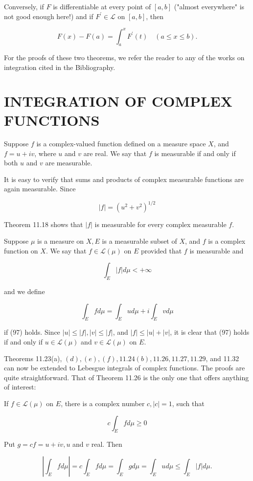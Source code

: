 \documentclass[10pt]{article}
\begin{document}
Conversely, if $F$ is differentiable at every point of $[a, b]$ ("almost everywhere" is not good enough here!) and if $F^{\prime} \in \mathscr{L}$ on $[a, b]$, then

$$
F(x)-F(a)=\int_{a}^{x} F^{\prime}(t) \quad(a \leq x \leq b) .
$$

For the proofs of these two theorems, we refer the reader to any of the works on integration cited in the Bibliography.

\section{INTEGRATION OF COMPLEX FUNCTIONS}
Suppose $f$ is a complex-valued function defined on a measure space $X$, and $f=u+i v$, where $u$ and $v$ are real. We say that $f$ is measurable if and only if both $u$ and $v$ are measurable.

It is easy to verify that sums and products of complex measurable functions are again measurable. Since

$$
|f|=\left(u^{2}+v^{2}\right)^{1 / 2}
$$

Theorem 11.18 shows that $|f|$ is measurable for every complex measurable $f$.

Suppose $\mu$ is a measure on $X, E$ is a measurable subset of $X$, and $f$ is a complex function on $X$. We say that $f \in \mathscr{L}(\mu)$ on $E$ provided that $f$ is measurable and

$$
\int_{E}|f| d \mu<+\infty
$$

and we define

$$
\int_{E} f d \mu=\int_{E} u d \mu+i \int_{E} v d \mu
$$

if (97) holds. Since $|u| \leq|f|,|v| \leq|f|$, and $|f| \leq|u|+|v|$, it is clear that (97) holds if and only if $u \in \mathscr{L}(\mu)$ and $v \in \mathscr{L}(\mu)$ on $E$.

Theorems 11.23(a), $(d),(e),(f), 11.24(b), 11.26,11.27,11.29$, and 11.32 can now be extended to Lebesgue integrals of complex functions. The proofs are quite straightforward. That of Theorem 11.26 is the only one that offers anything of interest:

If $f \in \mathscr{L}(\mu)$ on $E$, there is a complex number $c,|c|=1$, such that

$$
c \int_{E} f d \mu \geq 0
$$

Put $g=c f=u+i v, u$ and $v$ real. Then

$$
\left|\int_{E} f d \mu\right|=c \int_{E} f d \mu=\int_{E} g d \mu=\int_{E} u d \mu \leq \int_{E}|f| d \mu .
$$
\end{document}
